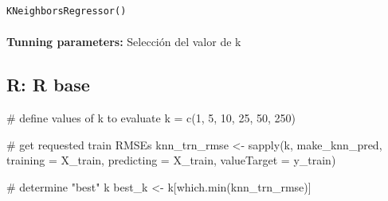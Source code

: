 \documentclass[
  letterpaper,
  DIV=11,
  numbers=noendperiod]{scrartcl}
\makeatletter
\let\oldparagraph\paragraph
\renewcommand{\paragraph}{
    \@ifstar
      \xxxParagraphStar
      \xxxParagraphNoStar
  }
\newcommand{\xxxParagraphStar}[1]{\oldparagraph*{#1}\mbox{}}
\newcommand{\xxxParagraphNoStar}[1]{\oldparagraph{#1}\mbox{}}
\newenvironment{Shaded}{\begin{snugshade}}{\end{snugshade}}
\newcommand{\AttributeTok}[1]{\textcolor[rgb]{0.40,0.45,0.13}{#1}}
\newcommand{\CommentTok}[1]{\textcolor[rgb]{0.37,0.37,0.37}{#1}}
\newcommand{\ControlFlowTok}[1]{\textcolor[rgb]{0.00,0.23,0.31}{\textbf{#1}}}
\newcommand{\DecValTok}[1]{\textcolor[rgb]{0.68,0.00,0.00}{#1}}
\newcommand{\FunctionTok}[1]{\textcolor[rgb]{0.28,0.35,0.67}{#1}}
\newcommand{\NormalTok}[1]{\textcolor[rgb]{0.00,0.23,0.31}{#1}}
\newcommand{\OtherTok}[1]{\textcolor[rgb]{0.00,0.23,0.31}{#1}}
\newcommand{\SpecialCharTok}[1]{\textcolor[rgb]{0.37,0.37,0.37}{#1}}
\makeatother
\begin{document}
\begin{verbatim}
KNeighborsRegressor()
\end{verbatim}

\paragraph{\texorpdfstring{\textbf{Tunning parameters:} Selección del
valor de
k}{Tunning parameters: Selección del valor de k}}\label{tunning-parameters-selecciuxf3n-del-valor-de-k-1}

\subsection{R: R base}

\begin{Shaded}
\end{Shaded}

\begin{Shaded}
\begin{Highlighting}[]
\CommentTok{\# define values of k to evaluate}
\NormalTok{k }\OtherTok{=} \FunctionTok{c}\NormalTok{(}\DecValTok{1}\NormalTok{, }\DecValTok{5}\NormalTok{, }\DecValTok{10}\NormalTok{, }\DecValTok{25}\NormalTok{, }\DecValTok{50}\NormalTok{, }\DecValTok{250}\NormalTok{)}

\CommentTok{\# get requested train RMSEs}
\NormalTok{knn\_trn\_rmse }\OtherTok{\textless{}{-}} \FunctionTok{sapply}\NormalTok{(k, make\_knn\_pred, }\AttributeTok{training =}\NormalTok{ X\_train, }
                      \AttributeTok{predicting =}\NormalTok{ X\_train, }
                      \AttributeTok{valueTarget =}\NormalTok{ y\_train)}

\CommentTok{\# determine "best" k}
\NormalTok{best\_k }\OtherTok{\textless{}{-}}\NormalTok{ k[}\FunctionTok{which.min}\NormalTok{(knn\_trn\_rmse)]}
\end{Highlighting}
\end{Shaded}
\end{document}
